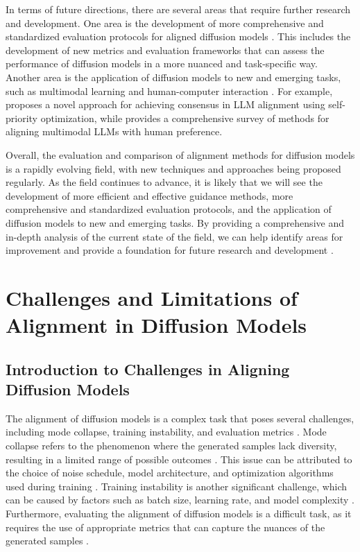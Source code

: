 \documentclass[11pt,a4paper]{article}
\begin{document}
In terms of future directions, there are several areas that require further research and development. One area is the development of more comprehensive and standardized evaluation protocols for aligned diffusion models \cite{arxiv:2508.09937}. This includes the development of new metrics and evaluation frameworks that can assess the performance of diffusion models in a more nuanced and task-specific way. Another area is the application of diffusion models to new and emerging tasks, such as multimodal learning and human-computer interaction \cite{arxiv:2502.10458}. For example, \cite{arxiv:2511.06222} proposes a novel approach for achieving consensus in LLM alignment using self-priority optimization, while \cite{arxiv:2503.14504} provides a comprehensive survey of methods for aligning multimodal LLMs with human preference.

Overall, the evaluation and comparison of alignment methods for diffusion models is a rapidly evolving field, with new techniques and approaches being proposed regularly. As the field continues to advance, it is likely that we will see the development of more efficient and effective guidance methods, more comprehensive and standardized evaluation protocols, and the application of diffusion models to new and emerging tasks. By providing a comprehensive and in-depth analysis of the current state of the field, we can help identify areas for improvement and provide a foundation for future research and development \cite{doi:10.1145/3626235}.


\section{Challenges and Limitations of Alignment in Diffusion Models}



\subsection{Introduction to Challenges in Aligning Diffusion Models}


The alignment of diffusion models is a complex task that poses several challenges, including mode collapse, training instability, and evaluation metrics \cite{doi:10.1109/tpami.2023.3261988}. Mode collapse refers to the phenomenon where the generated samples lack diversity, resulting in a limited range of possible outcomes \cite{doi:10.1145/3626235}. This issue can be attributed to the choice of noise schedule, model architecture, and optimization algorithms used during training \cite{arxiv:2208.11970}. Training instability is another significant challenge, which can be caused by factors such as batch size, learning rate, and model complexity \cite{arxiv:2210.09292}. Furthermore, evaluating the alignment of diffusion models is a difficult task, as it requires the use of appropriate metrics that can capture the nuances of the generated samples \cite{arxiv:2410.00083}.
\end{document}

